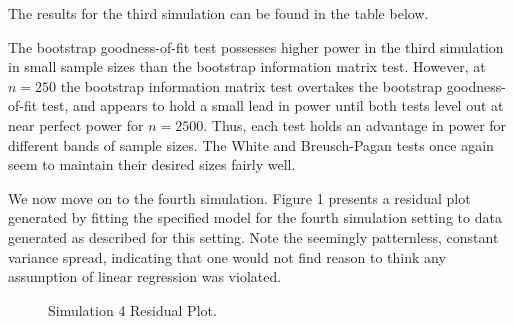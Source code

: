 \documentclass[12pt]{article} %
\theoremstyle{definition}
\begin{document}
The results for the third simulation can be found in the table below.

\begin{table}[H]
	\centering
	\small\addtolength{\tabcolsep}{-3pt}
	\setlength\extrarowheight{-3pt}
	{
	}
	\end{table}

The bootstrap goodness-of-fit test possesses higher power in the third simulation in small sample sizes than the bootstrap information matrix test. However, at $n = 250$ the bootstrap information matrix test
overtakes the bootstrap goodness-of-fit test, and appears to hold a small lead in power until both tests level out at near perfect power for $n = 2500$. Thus, each test holds an advantage in power for different bands of sample sizes.
The White and Breusch-Pagan tests once again seem to maintain their desired sizes fairly well.

We now move on to the fourth simulation. Figure 1 presents a residual plot generated by fitting the specified model for the fourth simulation setting to data generated as described for this setting.
Note the seemingly patternless, constant variance spread, indicating that one would not find reason to think any assumption of linear regression was violated. 

\begin{figure}[H]
\centerline{}\par  %
\caption{Simulation 4 Residual Plot.}
\end{figure}
\end{document}
